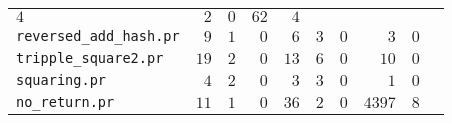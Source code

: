 \begin{tabular}{l|rrr|rrr|rrr}
            $ 4    $ & $ 2  $ & $ 0 $  &
         $ 62 $ & $ 4 $  \\
            \texttt{reversed\_add\_hash.pr} &
        $ 9 $ & $ 1 $ & $ 0 $ &
            $ 6    $ & $ 3  $ & $ 0 $  &
         $ 3 $ & $ 0 $  \\
            \texttt{tripple\_square2.pr} &
        $ 19 $ & $ 2 $ & $ 0 $ &
            $ 13    $ & $ 6  $ & $ 0 $  &
         $ 10 $ & $ 0 $  \\
            \texttt{squaring.pr} &
        $ 4 $ & $ 2 $ & $ 0 $ &
            $ 3    $ & $ 3  $ & $ 0 $  &
         $ 1 $ & $ 0 $  \\
            \texttt{no\_return.pr} &
        $ 11 $ & $ 1 $ & $ 0 $ &
            $ 36    $ & $ 2  $ & $ 0 $  &
         $ 4397 $ & $ 8 $  \\
        \bottomrule
\end{tabular}
